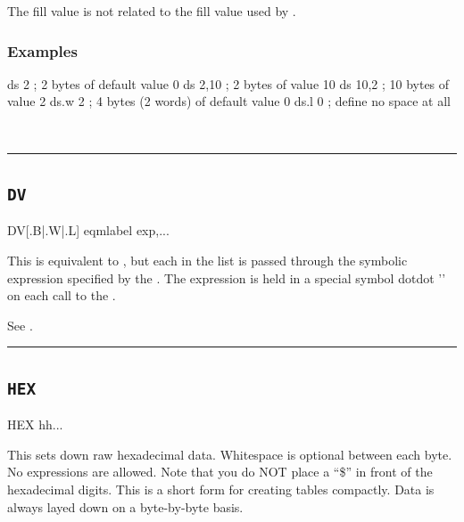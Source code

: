 The fill value is not related to the fill value used by .




\subsubsection{Examples}

\begin{code}[caption=Declaring Space]
 ds 2     ; 2 bytes of default value 0
 ds 2,10  ; 2 bytes of value 10
 ds 10,2  ; 10 bytes of value 2
 ds.w 2   ; 4 bytes (2 words) of default value 0
 ds.l 0   ; define no space at all
 \end{code}

\\

\hrule
\subsection{\texttt{DV}}
\label{pseudoop:dv}

\begin{usage}
  DV[{.B|.W|.L}] eqmlabel exp,...
\end{usage}

This is equivalent to , but each  in the list is passed
through the symbolic expression specified by the .
The expression is held in a special symbol dotdot '' on each
call to the .

See .\\

\hrule

\subsection{\texttt{HEX}}
\label{pseudoop:hex}

\begin{usage}
  HEX {hh...}
\end{usage}

This sets down raw hexadecimal data.  Whitespace is optional between each  byte.
No expressions are allowed.  Note that you do NOT place a ``\$''
in front of the hexadecimal digits.  This is a short form for creating
tables compactly.  Data is always layed down on a byte-by-byte
basis.


